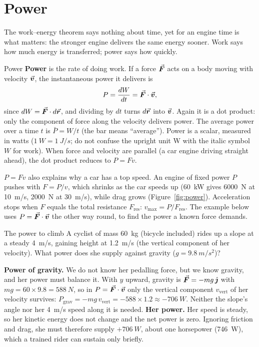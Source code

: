 
\section{Power}

The work--energy theorem says nothing about time, yet for an engine time is what matters: the stronger
engine delivers the same energy sooner. Work says how much energy is transferred; power says how quickly.

\begin{defbox}{Power}
\textbf{Power} is the rate of doing work. If a force $\vec{\bm{F}}$ acts on a body moving with velocity $\vec{\bm{v}}$, the
instantaneous power it delivers is
\[
P=\frac{dW}{dt}=\vec{\bm{F}}\cdot\vec{\bm{v}},
\]
since $dW=\vec{\bm{F}}\cdot d\vec{\bm{r}}$, and dividing by $dt$ turns $d\vec{\bm{r}}$ into $\vec{\bm{v}}$. Again it is a dot product: only
the component of force along the velocity delivers power. The average power
over a time $t$ is $\bar P=W/t$ (the bar means ``average''). Power is a scalar, measured in watts
($\SI{1}{W}=\SI{1}{J/s}$; do not confuse the upright unit W with the italic symbol $W$ for work). When
force and velocity are parallel (a car engine driving straight ahead), the dot product reduces to $P=Fv$.
\end{defbox}

$P=Fv$ also explains why a car has a top speed. An engine of fixed power $P$ pushes with $F=P/v$, which
shrinks as the car speeds up (\SI{60}{kW} gives \SI{6000}{N} at \SI{10}{m/s}, \SI{2000}{N} at
\SI{30}{m/s}), while drag grows (Figure~\ref{fig:power}). Acceleration stops when $F$ equals the total
resistance $F_{\text{res}}$: $v_{\max}=P/F_{\text{res}}$. The example below uses $P=\vec{\bm{F}}\cdot\vec{\bm{v}}$ the
other way round, to find the power a known force demands.

\begin{exbox}{The power to climb}
A cyclist of mass \SI{60}{kg} (bicycle included) rides up a slope at a steady \SI{4}{m/s}, gaining
height at \SI{1.2}{m/s} (the vertical component of her velocity). What power does she supply against
gravity ($g=\SI{9.8}{m/s^2}$)?

 \textbf{Power of gravity.} We do not know her pedalling force, but we know gravity, and her
power must balance it. With $y$ upward, gravity is $\vec{\bm{F}}=-mg\,\hat{\bm{\jmath}}$ with
$mg=60\times9.8=\SI{588}{N}$, so in $P=\vec{\bm{F}}\cdot\vec{\bm{v}}$ only the vertical component $v_{\text{vert}}$ of her
velocity survives: $P_{\text{grav}}=-mg\,v_{\text{vert}}=-588\times1.2\approx\SI{-706}{W}$. Neither the
slope's angle nor her \SI{4}{m/s} speed along it is needed.
 \textbf{Her power.} Her speed is steady, so her kinetic energy does not change and the net
power is zero. Ignoring friction and drag, she must therefore supply $+\SI{706}{W}$, about one
horsepower (\SI{746}{W}), which a trained rider can sustain only briefly. 
\end{exbox}

